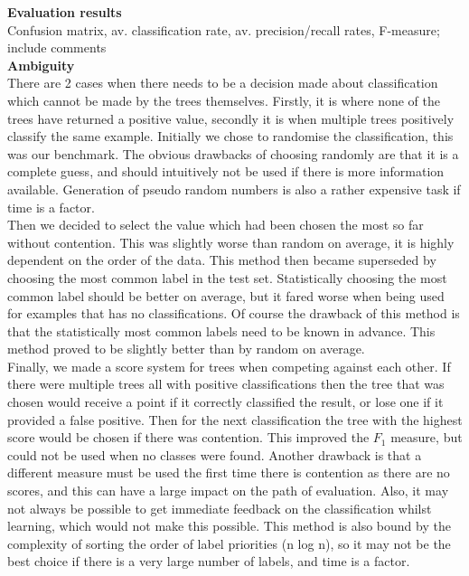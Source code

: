 \documentclass[12pt]{article}
\begin{document}
{\bf Evaluation results} \\
Confusion matrix, av. classification rate, av. precision/recall rates, F-measure; include comments \\

{\bf Ambiguity} \\
There are 2 cases when there needs to be a decision made about classification which cannot be made by the trees themselves. Firstly, it is where none of the trees have returned a positive value, secondly it is when multiple trees positively classify the same example. Initially we chose to randomise the classification, this was our benchmark. The obvious drawbacks of choosing randomly are that it is a complete guess, and should intuitively not be used if there is more information available. Generation of pseudo random numbers is also a rather expensive task if time is a factor. \\

Then we decided to select the value which had been chosen the most so far without contention. This was slightly worse than random on average, it is highly dependent on the order of the data. This method then became superseded by choosing the most common label in the test set. Statistically choosing the most common label should be better on average, but it fared worse when being used for examples that has no classifications. Of course the drawback of this method is that the statistically most common labels need to be known in advance. This method proved to be slightly better than by random on average. \\

Finally, we made a score system for trees when competing against each other. If there were multiple trees all with positive classifications then the tree that was chosen would receive a point if it correctly classified the result, or lose one if it provided a false positive. Then for the next classification the tree with the highest score would be chosen if there was contention. This improved the \( F_1 \) measure, but could not be used when no classes were found. Another drawback is that a different measure must be used the first time there is contention as there are no scores, and this can have a large impact on the path of evaluation. Also, it may not always be possible to get immediate feedback on the classification whilst learning, which would not make this possible. This method is also bound by the complexity of sorting the order of label priorities (n log n), so it may not be the best choice if there is a very large number of labels, and time is a factor. \\
\end{document}
